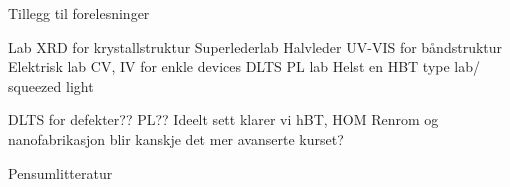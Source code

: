\documentclass[%
oneside,                 %
final,                   %
10pt]{article}
\begin{document}
Tillegg til forelesninger 

Lab 
XRD for krystallstruktur 
Superlederlab 
Halvleder 
UV-VIS for båndstruktur 
Elektrisk lab 
CV, IV for enkle devices 
DLTS 
PL lab 
Helst en HBT type lab/ squeezed light  

DLTS for defekter?? 
PL?? 
Ideelt sett klarer vi hBT, HOM 
Renrom og nanofabrikasjon blir kanskje det mer avanserte kurset? 

Pensumlitteratur 


\end{document}
